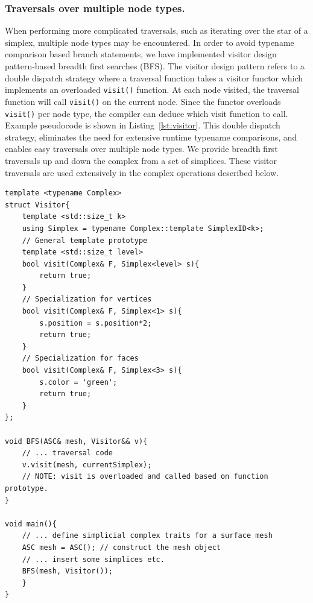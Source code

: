 	\subsubsection{Traversals over multiple node types.}
		\par When performing more complicated traversals, such as iterating over the star of a simplex, multiple node types may be encountered. In order to avoid typename comparison based branch statements, we have implemented visitor design pattern-based breadth first searches (BFS). The visitor design pattern refers to a double dispatch strategy where a traversal function takes a visitor functor which implements an overloaded \verb|visit()| function. At each node visited, the traversal function will call \verb|visit()| on the current node. Since the functor overloads \verb|visit()| per node type, the compiler can deduce which visit function to call. Example pseudocode is shown in Listing~\ref{lst:visitor}. This double dispatch strategy, eliminates the need for extensive runtime typename comparisons, and enables easy traversals over multiple node types. We provide breadth first traversals up and down the complex from a set of simplices. These visitor traversals are used extensively in the complex operations described below.
\begin{lstlisting}[label={lst:visitor},caption={Example pseudocode of double dispatch to traverse the complex while
scaling the mesh by 2 and coloring the faces green.},captionpos=b]
template <typename Complex>
struct Visitor{
	template <std::size_t k>
	using Simplex = typename Complex::template SimplexID<k>;
	// General template prototype
	template <std::size_t level>
	bool visit(Complex& F, Simplex<level> s){
		return true;
	}
	// Specialization for vertices
	bool visit(Complex& F, Simplex<1> s){
		s.position = s.position*2;
		return true;
	}
	// Specialization for faces
	bool visit(Complex& F, Simplex<3> s){
		s.color = 'green';
		return true;
	}
};

void BFS(ASC& mesh, Visitor&& v){
	// ... traversal code
	v.visit(mesh, currentSimplex);
	// NOTE: visit is overloaded and called based on function prototype.
}

void main(){
	// ... define simplicial complex traits for a surface mesh
	ASC mesh = ASC(); // construct the mesh object
	// ... insert some simplices etc.
	BFS(mesh, Visitor());
	}
}
\end{lstlisting}

